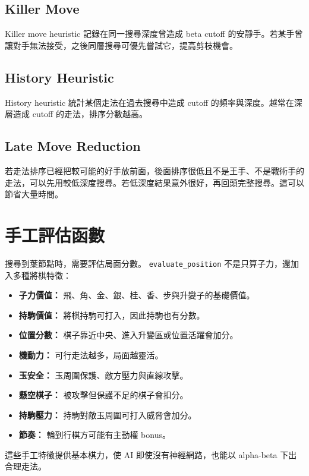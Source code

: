 \documentclass[12pt,a4paper,fontset=none]{ctexart}
\begin{document}
\subsection{Killer Move}

Killer move heuristic 記錄在同一搜尋深度曾造成 beta cutoff 的安靜手。若某手曾讓對手無法接受，之後同層搜尋可優先嘗試它，提高剪枝機會。

\subsection{History Heuristic}

History heuristic 統計某個走法在過去搜尋中造成 cutoff 的頻率與深度。越常在深層造成 cutoff 的走法，排序分數越高。

\subsection{Late Move Reduction}

若走法排序已經把較可能的好手放前面，後面排序很低且不是王手、不是戰術手的走法，可以先用較低深度搜尋。若低深度結果意外很好，再回頭完整搜尋。這可以節省大量時間。

\section{手工評估函數}

搜尋到葉節點時，需要評估局面分數。 \texttt{evaluate\_position} 不是只算子力，還加入多種將棋特徵：

\begin{itemize}
  \item \textbf{子力價值：} 飛、角、金、銀、桂、香、步與升變子的基礎價值。
  \item \textbf{持駒價值：} 將棋持駒可打入，因此持駒也有分數。
  \item \textbf{位置分數：} 棋子靠近中央、進入升變區或位置活躍會加分。
  \item \textbf{機動力：} 可行走法越多，局面越靈活。
  \item \textbf{玉安全：} 玉周圍保護、敵方壓力與直線攻擊。
  \item \textbf{懸空棋子：} 被攻擊但保護不足的棋子會扣分。
  \item \textbf{持駒壓力：} 持駒對敵玉周圍可打入威脅會加分。
  \item \textbf{節奏：} 輪到行棋方可能有主動權 bonus。
\end{itemize}

這些手工特徵提供基本棋力，使 AI 即使沒有神經網路，也能以 alpha-beta 下出合理走法。
\end{document}
